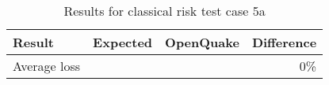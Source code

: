 \begin{table}[htbp]

\centering
\begin{tabular}{ l r r r }

\hline
\rowcolor{anti-flashwhite}
\bf{Result} & \bf{Expected} & \bf{OpenQuake} & \bf{Difference}\\
\hline
Average loss &  &  & 0\% \\
\hline
\end{tabular}

\caption{Results for classical risk test case 5a}
\label{tab:result-classical-risk-5a}
\end{table}